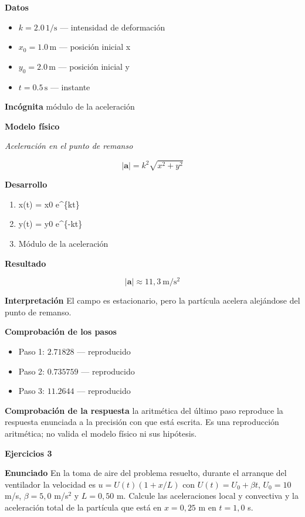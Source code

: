\documentclass[10pt,openany]{book}
\begin{document}
\noindent\textbf{Datos}
\begin{itemize}
\item $k = 2.0\,\mathrm{1/s}$ — intensidad de deformación
\item $x_{0} = 1.0\,\mathrm{m}$ — posición inicial x
\item $y_{0} = 2.0\,\mathrm{m}$ — posición inicial y
\item $t = 0.5\,\mathrm{s}$ — instante
\end{itemize}

\noindent\textbf{Incógnita}
módulo de la aceleración

\noindent\textbf{Modelo físico}

\noindent\textit{Aceleración en el punto de remanso}

\[
|\mathbf{a}| = k^{2}\sqrt{x^{2} + y^{2}}
\]

\noindent\textbf{Desarrollo}
\begin{enumerate}
\item
x(t) = x0 e\textasciicircum{}\{kt\}
\item
y(t) = y0 e\textasciicircum{}\{-kt\}
\item
Módulo de la aceleración
\end{enumerate}

\noindent\textbf{Resultado}

\[
|\mathbf{a}| \approx 11{,}3\ \mathrm{m/s^{2}}
\]

\noindent\textbf{Interpretación}
El campo es estacionario, pero la partícula acelera alejándose del punto de remanso.

\noindent\textbf{Comprobación de los pasos}
\begin{itemize}
\item Paso 1: $2.71828$ — reproducido
\item Paso 2: $0.735759$ — reproducido
\item Paso 3: $11.2644$ — reproducido
\end{itemize}

\noindent\textbf{Comprobación de la respuesta} la aritmética del último paso reproduce la respuesta enunciada a la precisión con que está escrita. Es una reproducción aritmética; no valida el modelo físico ni sus hipótesis.

\noindent\textbf{Ejercicios 3}

\noindent\textbf{Enunciado}
En la toma de aire del problema resuelto, durante el arranque del ventilador la velocidad es \(u = U(t)(1 + x/L)\) con \(U(t) = U_0 + \beta t\), \(U_0 = 10\) m/s, \(\beta = 5{,}0\) m/s\(^2\) y \(L = 0{,}50\) m. Calcule las aceleraciones local y convectiva y la aceleración total de la partícula que está en \(x = 0{,}25\) m en \(t = 1{,}0\) s.
\end{document}
